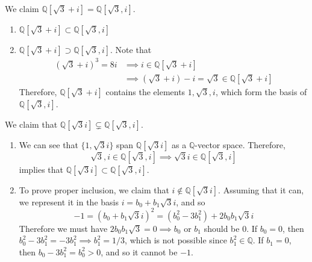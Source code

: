   \begin{example}
    We claim $\mathbb{Q}[\sqrt{3} + i] = \mathbb{Q}[\sqrt{3}, i]$. 
    \begin{enumerate}
      \item $\mathbb{Q}[\sqrt{3} + i] \subset \mathbb{Q}[\sqrt{3}, i]$
      \item $\mathbb{Q}[\sqrt{3} + i] \supset \mathbb{Q}[\sqrt{3}, i]$. Note that 
        \begin{align}
          (\sqrt{3} + i)^3 = 8i & \implies i \in \mathbb{Q}[\sqrt{3} + i] \\
                                & \implies (\sqrt{3} + i) - i = \sqrt{3} \in \mathbb{Q}[\sqrt{3} + i] 
        \end{align}
        Therefore, $\mathbb{Q}[\sqrt{3} + i]$ contains the elements $1, \sqrt{3}, i$, which form the basis of $\mathbb{Q}[\sqrt{3}, i]$. 
    \end{enumerate}
  \end{example}

  \begin{example}
    We claim that $\mathbb{Q}[\sqrt{3} i] \subsetneq \mathbb{Q}[\sqrt{3}, i]$. 
    \begin{enumerate}
      \item We can see that $\{1, \sqrt{3}i \}$ span $\mathbb{Q}[\sqrt{3}i ]$ as a $\mathbb{Q}$-vector space. Therefore, 
      \begin{equation}
        \sqrt{3}, i \in \mathbb{Q}[\sqrt{3}, i] \implies \sqrt{3} i \in \mathbb{Q}[\sqrt{3}, i]
      \end{equation} 
      implies that $\mathbb{Q}[\sqrt{3} i] \subset \mathbb{Q}[\sqrt{3}, i]$. 

      \item To prove proper inclusion, we claim that $i \not\in \mathbb{Q}[\sqrt{3}i]$. Assuming that it can, we represent it in the basis $i = b_0 + b_1 \sqrt{3} i$, and so
      \begin{equation}
        -1 = (b_0 + b_1 \sqrt{3} i)^2 = (b_0^2 - 3b_1^2) + 2b_0 b_1 \sqrt{3} i
      \end{equation}
      Therefore we must have $2b_0 b_1 \sqrt{3} = 0 \implies b_0$ or $b_1$ should be $0$. If $b_0 = 0$, then $b_0^2 - 3b_1^2 = -3 b_1^2 \implies b_1^2 = 1/3$, which is not possible since $b_1^2 \in \mathbb{Q}$. If $b_1 = 0$, then $b_0 - 3 b_1^2 = b_0^2 > 0$, and so it cannot be $-1$. 
    \end{enumerate}
  \end{example}

